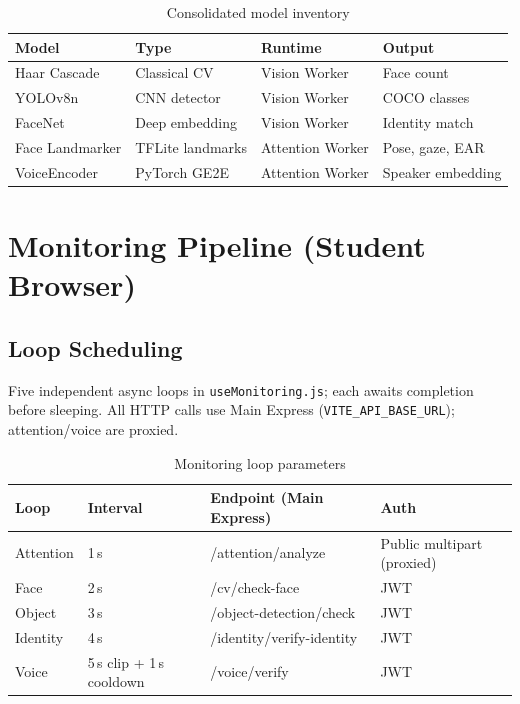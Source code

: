 \documentclass[11pt,a4paper]{report}
\begin{document}
\begin{table}[H]
\centering
\small
\caption{Consolidated model inventory}
\begin{tabularx}{\textwidth}{@{}llll@{}}
\toprule
\textbf{Model} & \textbf{Type} & \textbf{Runtime} & \textbf{Output} \\
\midrule
Haar Cascade & Classical CV & Vision Worker & Face count \\
YOLOv8n & CNN detector & Vision Worker & COCO classes \\
FaceNet & Deep embedding & Vision Worker & Identity match \\
Face Landmarker & TFLite landmarks & Attention Worker & Pose, gaze, EAR \\
VoiceEncoder & PyTorch GE2E & Attention Worker & Speaker embedding \\
\bottomrule
\end{tabularx}
\end{table}

\chapter{Monitoring Pipeline (Student Browser)}

\section{Loop Scheduling}
Five independent async loops in \texttt{useMonitoring.js}; each awaits completion before sleeping. All HTTP calls use Main Express (\texttt{VITE\_API\_BASE\_URL}); attention/voice are proxied.

\begin{table}[H]
\centering
\caption{Monitoring loop parameters}
\begin{tabular}{@{}llll@{}}
\toprule
\textbf{Loop} & \textbf{Interval} & \textbf{Endpoint (Main Express)} & \textbf{Auth} \\
\midrule
Attention & 1\,s & /attention/analyze & Public multipart (proxied) \\
Face & 2\,s & /cv/check-face & JWT \\
Object & 3\,s & /object-detection/check & JWT \\
Identity & 4\,s & /identity/verify-identity & JWT \\
Voice & 5\,s clip + 1\,s cooldown & /voice/verify & JWT \\
\bottomrule
\end{tabular}
\end{table}
\end{document}
